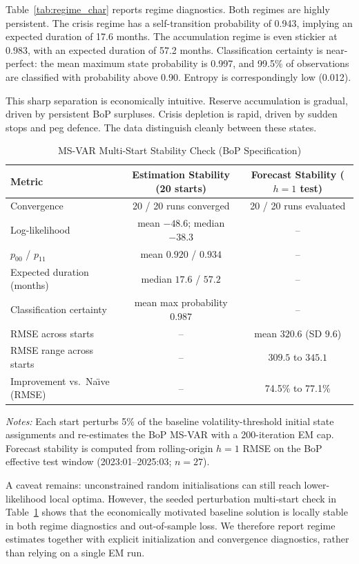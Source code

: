 \documentclass[12pt,a4paper]{article}
\begin{document}
Table~\ref{tab:regime_char} reports regime diagnostics. Both regimes are highly persistent. The crisis regime has a self-transition probability of 0.943, implying an expected duration of 17.6 months. The accumulation regime is even stickier at 0.983, with an expected duration of 57.2 months. Classification certainty is near-perfect: the mean maximum state probability is 0.997, and 99.5\% of observations are classified with probability above 0.90. Entropy is correspondingly low (0.012).

This sharp separation is economically intuitive. Reserve accumulation is gradual, driven by persistent BoP surpluses. Crisis depletion is rapid, driven by sudden stops and peg defence. The data distinguish cleanly between these states.

\begin{table}[htbp]
\centering
\caption{MS-VAR Multi-Start Stability Check (BoP Specification)}
\label{tab:multistart}
\begin{tabular}{lcc}
\toprule
Metric & Estimation Stability (20 starts) & Forecast Stability ($h=1$ test) \\
\midrule
Convergence & 20 / 20 runs converged & 20 / 20 runs evaluated \\
Log-likelihood & mean $-48.6$; median $-38.3$ & -- \\
$p_{00}$ / $p_{11}$ & mean $0.920$ / $0.934$ & -- \\
Expected duration (months) & median $17.6$ / $57.2$ & -- \\
Classification certainty & mean max probability $0.987$ & -- \\
RMSE across starts & -- & mean $320.6$ (SD $9.6$) \\
RMSE range across starts & -- & $309.5$ to $345.1$ \\
Improvement vs.\ Na\"{\i}ve (RMSE) & -- & 74.5\% to 77.1\% \\
\bottomrule
\end{tabular}
\begin{tablenotes}
\small
\item \textit{Notes:} Each start perturbs 5\% of the baseline volatility-threshold initial state assignments and re-estimates the BoP MS-VAR with a 200-iteration EM cap. Forecast stability is computed from rolling-origin $h=1$ RMSE on the BoP effective test window (2023:01--2025:03; $n=27$).
\end{tablenotes}
\end{table}

A caveat remains: unconstrained random initialisations can still reach lower-likelihood local optima. However, the seeded perturbation multi-start check in Table~\ref{tab:multistart} shows that the economically motivated baseline solution is locally stable in both regime diagnostics and out-of-sample loss. We therefore report regime estimates together with explicit initialization and convergence diagnostics, rather than relying on a single EM run.
\end{document}
